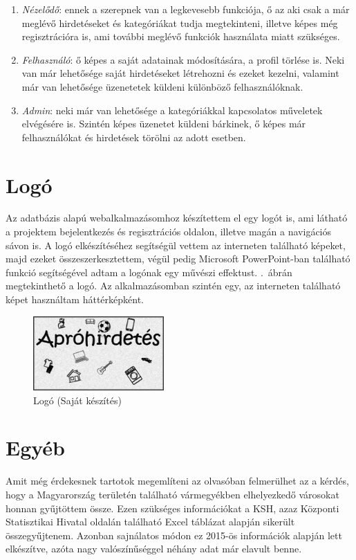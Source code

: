 \documentclass[]{thesis-ekf}
\theoremstyle{definition}
\theoremstyle{remark}
\begin{document}
	\begin{enumerate}
		\item \emph{Nézelődő}: ennek a szerepnek van a legkevesebb funkciója, ő az aki csak a már meglévő hirdetéseket és kategóriákat tudja megtekinteni, illetve képes még regisztrációra is, ami további meglévő funkciók használata miatt szükséges.
		\item \emph{Felhasználó}: ő képes a saját adatainak módosítására, a profil törlése is. Neki van már lehetősége saját hirdetéseket létrehozni és ezeket kezelni, valamint már van lehetősége üzenetetek küldeni különböző felhasználóknak.
		\item \emph{Admin}: neki már van lehetősége a kategóriákkal kapcsolatos műveletek elvégésére is. Szintén képes üzenetet küldeni bárkinek, ő képes már felhasználókat és hirdetések törölni az adott esetben.
	\end{enumerate}
	\section{Logó}
		Az adatbázis alapú webalkalmazásomhoz készítettem el egy logót is, ami látható a projektem bejelentkezés és regisztrációs oldalon, illetve magán a navigációs sávon is. A logó elkészítéséhez segítségül vettem az interneten található képeket, majd ezeket összeszerkesztettem, végül pedig Microsoft PowerPoint-ban található funkció segítségével adtam a logónak egy művészi effektust. .~ábrán megtekinthető a logó. Az alkalmazásomban szintén egy, az interneten található képet használtam háttérképként. \cite{Hatterkep, Logo}
		\begin{figure}[ht!]
			\centering
			\includegraphics[width=5cm]{./tervezes/logo}
			\caption{Logó (Saját készítés)} 
			\label{logo}
		\end{figure}
	
	\section{Egyéb}
		Amit még érdekesnek tartotok megemlíteni az olvasóban felmerülhet az a kérdés, hogy a Magyarország területén található vármegyékben elhelyezkedő városokat honnan gyűjtöttem össze. Ezen szükséges információkat a KSH, azaz Központi Statisztikai Hivatal oldalán található Excel táblázat alapján sikerült összegyűjtenem. Azonban sajnálatos módon ez 2015-ös információk alapján lett elkészítve, azóta nagy valószínűséggel néhány adat már elavult benne. \cite{KSH}
\end{document}
